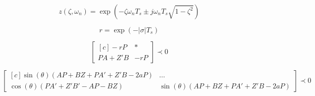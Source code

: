 \begin{equation}
  z(\zeta,\omega_n) = \exp{\left(-\zeta\omega_nT_s \pm j\omega_nT_s\sqrt{1-\zeta^2}\right)}\label{eq:FuncaoPontoZ}
\end{equation}

\begin{equation}
  r = \exp{\left(-|\sigma|T_s\right)}\label{eq:RaioEstabilidadeRelativa}
\end{equation}

\begin{figure}[H]
  \centering
  \begin{subfigure}[t]{0.3\columnwidth}
      
      \caption{}
  \end{subfigure}
  \begin{subfigure}[t]{0.3\columnwidth}
      
      \caption{}
  \end{subfigure}
  \begin{subfigure}[t]{0.3\columnwidth}
    
    \caption{}
  \end{subfigure}
  \caption{}
\end{figure}

\begin{figure}[H]
  \centering
  \begin{subfigure}[t]{0.3\columnwidth}
      
      \caption{}
  \end{subfigure}
  \begin{subfigure}[t]{0.3\columnwidth}
      
      \caption{}
  \end{subfigure}
  \begin{subfigure}[t]{0.3\columnwidth}
    
    \caption{}
  \end{subfigure}
  \caption{}
\end{figure}

\begin{equation}
  \begin{bmatrix*}[c]
    -rP       & * \\
    PA + Z'B  & -rP
  \end{bmatrix*}
  \prec 0\label{eq:LMIEstabilidadeRelativa}
\end{equation}

\begin{equation}
  \begin{bmatrix*}[c]
    \sin{(\theta)(AP + BZ + PA' + Z'B -2aP)} &  \dots \\
    \cos{(\theta)(PA' + Z'B'- AP - BZ)}      &  \sin{(\theta)(AP + BZ + PA' + Z'B -2aP)}
  \end{bmatrix*}
  \prec 0\label{eq:LMIESetorConicoEsquerdo}
\end{equation}

